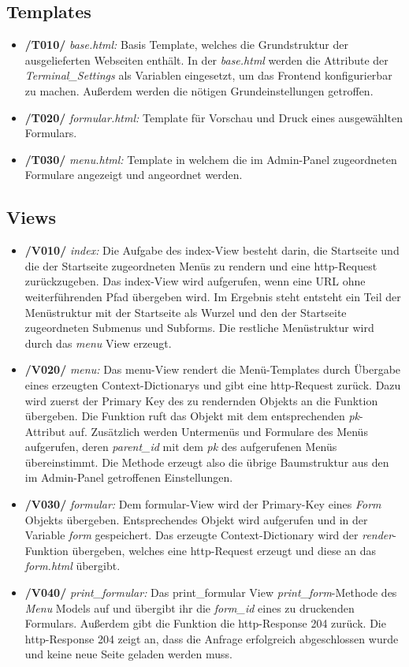 \vspace{1,5cm}

\subsection{Templates}
\begin{itemize}
    \item \textbf{/T010/} \textit{base.html:} Basis Template, welches die Grundstruktur der ausgelieferten Webseiten enthält. In der \textit{base.html} werden die Attribute der \textit{Terminal\_Settings} als Variablen eingesetzt, um das Frontend konfigurierbar zu machen. Außerdem werden die nötigen Grundeinstellungen getroffen.
    \item \textbf{/T020/} \textit{formular.html:} Template für Vorschau und Druck eines ausgewählten Formulars.
    \item \textbf{/T030/} \textit{menu.html:} Template in welchem die im Admin-Panel zugeordneten Formulare angezeigt und angeordnet werden.
\end{itemize}
\newpage
\subsection{Views}
\begin{itemize}
    \item \textbf{/V010/} \textit{index:} Die Aufgabe des index-View besteht darin, die Startseite und die der Startseite zugeordneten Menüs zu rendern und eine http-Request zurückzugeben.  Das index-View wird aufgerufen, wenn eine URL ohne weiterführenden Pfad übergeben wird. Im Ergebnis steht entsteht ein Teil der Menüstruktur mit der Startseite als Wurzel und den der Startseite zugeordneten Submenus und Subforms. Die restliche Menüstruktur wird durch das \textit{menu} View erzeugt.
    \item \textbf{/V020/} \textit{menu:}  Das menu-View rendert die Menü-Templates durch Übergabe eines erzeugten Context-Dictionarys und gibt eine http-Request zurück. Dazu wird zuerst der Primary Key des zu rendernden Objekts an die Funktion übergeben. Die Funktion ruft das Objekt mit dem entsprechenden \textit{pk}-Attribut auf. Zusätzlich werden Untermenüs und Formulare des Menüs aufgerufen, deren \textit{parent\_id} mit dem \textit{pk} des aufgerufenen Menüs übereinstimmt. Die Methode erzeugt also die übrige Baumstruktur aus den im Admin-Panel getroffenen Einstellungen.
    \item \textbf{/V030/} \textit{formular:} Dem formular-View wird der Primary-Key eines \textit{Form} Objekts übergeben. Entsprechendes Objekt wird aufgerufen und in der Variable \textit{form} gespeichert. Das erzeugte Context-Dictionary wird der \textit{render}-Funktion übergeben, welches eine http-Request erzeugt und diese an das \textit{form.html} übergibt.
    \item \textbf{/V040/} \textit{print\_formular:} Das print\_formular View \textit{print\_form}-Methode des \textit{Menu} Models auf und übergibt ihr die \textit{form\_id} eines zu druckenden Formulars. Außerdem gibt die Funktion die http-Response 204 zurück. Die http-Response 204 zeigt an, dass die Anfrage erfolgreich abgeschlossen wurde und keine neue Seite geladen werden muss. 
\end{itemize}
\newpage 